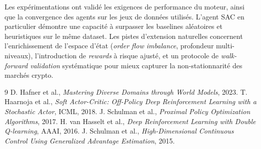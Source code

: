 \documentclass[11pt,a4paper]{article}
\begin{document}
Les expérimentations ont validé les exigences de
performance du moteur, ainsi que la convergence des
agents sur les jeux de données utilisés. L'agent SAC
en particulier démontre une capacité à surpasser les
baselines aléatoires et heuristiques sur le même dataset.
Les pistes d'extension naturelles concernent l'enrichissement de
l'espace d'état (\textit{order flow imbalance},
profondeur multi-niveaux), l'introduction de
\textit{rewards} à risque ajusté, et un protocole de
\textit{walk-forward validation} systématique pour
mieux capturer la non-stationnarité des marchés crypto.

\begin{thebibliography}{9}
 D. Hafner et al., \emph{Mastering Diverse Domains through World Models}, 2023.
 T. Haarnoja et al., \emph{Soft Actor-Critic: Off-Policy Deep Reinforcement Learning with a Stochastic Actor}, ICML, 2018.
 J. Schulman et al., \emph{Proximal Policy Optimization Algorithms}, 2017.
 H. van Hasselt et al., \emph{Deep Reinforcement Learning with Double Q-learning}, AAAI, 2016.
 J. Schulman et al., \emph{High-Dimensional Continuous Control Using Generalized Advantage Estimation}, 2015.
\end{thebibliography}
\end{document}
